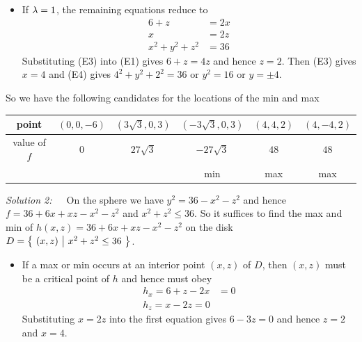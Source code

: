 \begin{solution}
\begin{itemize}
\item
If $\lambda=1$, the remaining equations reduce to
\begin{align*}
6+z &=2 x  \tag{E1} \\ 
x &=2 z \tag{E3} \\ 
x^2  +y^2 + z^2 &= 36 \tag{E4}
\end{align*}
Substituting (E3) into (E1) gives $6+z=4z$ and hence $z=2$. Then (E3)
gives $x=4$ and (E4) gives $4^2 + y^2 + 2^2 =36$ or $y^2=16$ or $y=\pm 4$.
\end{itemize}
So we have the following candidates for the locations of the min and max
\begin{center}
\renewcommand{\arraystretch}{1.3}
     \begin{tabular}{|c|c|c|c|c|c|}
     \hline
       point
       &$(0,0, -6)$
       &$(3\sqrt{3},0,3)$
       &$(-3\sqrt{3},0,3)$
       &$(4,4,2) $
       &$(4,-4,2) $ \\ \hline
       value of $f$
       &$0$
       &$27\sqrt{3}$
       &$-27\sqrt{3}$
       &$48$ 
       &$48$\\ \hline
       &
       & 
       &min 
       &max
       &max \\ \hline
     \end{tabular}
\renewcommand{\arraystretch}{1.0}
\end{center}


\emph{Solution 2:}\ \ \ 
On the sphere we have $y^2=36-x^2-z^2$ and hence
$f= 36 + 6x +xz -x^2-z^2$ and $x^2+z^2\le 36$. So it suffices
to find the max and min of $h(x,z)= 36 + 6x +xz -x^2-z^2$
on the disk $D=\big\{ \ (x,z)\ \big|\ x^2+z^2\le 36\ \big\}$. 
\begin{itemize}
\item
If a max or min occurs at an interior point $(x,z)$ of $D$,
then $(x,z)$ must be a critical point of $h$ and hence must obey
\begin{align*}
h_x = 6+z-2x&=0 \\
h_z = x-2z=0
\end{align*}
Substituting $x=2z$ into the first equation gives $6-3z=0$ 
and hence $z=2$ and $x=4$.


\end{itemize}
\end{solution}

